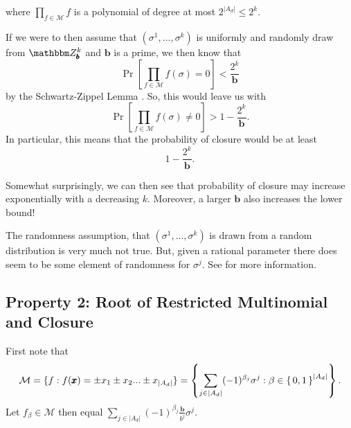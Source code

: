 \documentclass[11pt,titlepage]{article}
\newcommand{\commonBase}{{\pmb{b}}}
\newcommand{\numbToCommon}{\frac{\commonBase}{b^j}}
\newcommand{\digSumPeriodic}{\sigma^j}
\newcommand{\digSumPeriodicNoJ}{{\sigma}}
\begin{document}
where $\prod_{f \in \mathcal{M}} f$ is a polynomial of degree
at most $2^{|A_d|} \leq 2^k$.

If we were to then assume that $(\digSumPeriodicNoJ^1, ..., \digSumPeriodicNoJ^k)$ 
is uniformly and randomly draw from $\Z_\commonBase^k$ and $\commonBase$ is a prime, we then know that
$$
  \Pr\left[\prod_{f \in \mathcal{M}} f(\digSumPeriodicNoJ) = 0\right] < \frac{2^k}{\commonBase}
$$
by the Schwartz-Zippel Lemma \cite{Shwartz} \cite{Zip}.
So, this would leave us with
$$
  \Pr\left[\prod_{f \in \mathcal{M}} f(\digSumPeriodicNoJ) \neq 0\right] > 1 - \frac{2^k}{\commonBase}.
$$
In particular, this means that the probability of closure would be at least
$$
1 - \frac{2^k}{\commonBase}.
$$

Somewhat surprisingly, we can then see that probability of closure may increase exponentially
with a decreasing $k$. Moreover, a larger $\commonBase$ also increases the lower bound!

\begin{remark}
\label{remark:digSumRandomness}
  The randomness assumption, that $(\digSumPeriodicNoJ^1, ..., \digSumPeriodicNoJ^k)$
  is drawn from a random distribution is very much not true. But, given a rational parameter
  there does seem to be some element of randomness for $\digSumPeriodic$. See \cite{OnDecSeq} for more information.
\end{remark}

\subsection{Property 2: Root of Restricted Multinomial and Closure}
First note that
$$
\mathcal{M} = \{f : f(\pmb{x}) = \pm x_1 \pm x_2 ... \pm x_{|A_d|}\} = 
  \left\{\sum_{j \in |A_d|} (-1)^{\beta_j} \digSumPeriodic : \beta \in \set{0, 1}^{|A_d|} \right\}.
$$
Let $f_\beta \in \mathcal{M}$ then equal $\sum_{j \in |A_d|} (-1)^{\beta_j}\numbToCommon \digSumPeriodic$.
\end{document}
